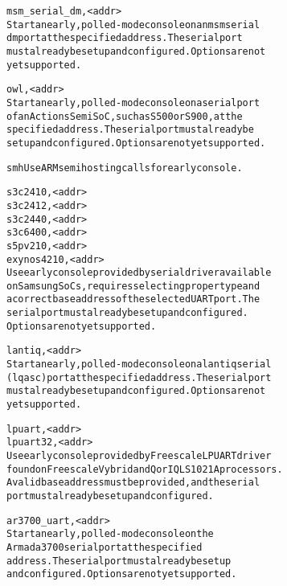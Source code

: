 \documentclass[a4paper,8pt,english]{sphinxmanual}
\begin{document}
\begin{alltt}
                msm\_serial\_dm,\textless{}addr\textgreater{}
                        Start an early, polled-mode console on an msm serial
                        dm port at the specified address. The serial port
                        must already be setup and configured. Options are not
                        yet supported.

                owl,\textless{}addr\textgreater{}
                        Start an early, polled-mode console on a serial port
                        of an Actions Semi SoC, such as S500 or S900, at the
                        specified address. The serial port must already be
                        setup and configured. Options are not yet supported.

                smh     Use ARM semihosting calls for early console.

                s3c2410,\textless{}addr\textgreater{}
                s3c2412,\textless{}addr\textgreater{}
                s3c2440,\textless{}addr\textgreater{}
                s3c6400,\textless{}addr\textgreater{}
                s5pv210,\textless{}addr\textgreater{}
                exynos4210,\textless{}addr\textgreater{}
                        Use early console provided by serial driver available
                        on Samsung SoCs, requires selecting proper type and
                        a correct base address of the selected UART port. The
                        serial port must already be setup and configured.
                        Options are not yet supported.

                lantiq,\textless{}addr\textgreater{}
                        Start an early, polled-mode console on a lantiq serial
                        (lqasc) port at the specified address. The serial port
                        must already be setup and configured. Options are not
                        yet supported.

                lpuart,\textless{}addr\textgreater{}
                lpuart32,\textless{}addr\textgreater{}
                        Use early console provided by Freescale LP UART driver
                        found on Freescale Vybrid and QorIQ LS1021A processors.
                        A valid base address must be provided, and the serial
                        port must already be setup and configured.

                ar3700\_uart,\textless{}addr\textgreater{}
                        Start an early, polled-mode console on the
                        Armada 3700 serial port at the specified
                        address. The serial port must already be setup
                        and configured. Options are not yet supported.


\end{alltt}
\end{document}
